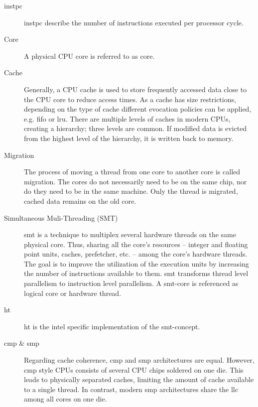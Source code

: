 \begin{description}
  \item[\Gls{instpc}] \Gls{instpc} describe the number of instructions executed
    per processor cycle.


  \item[Core] A physical CPU core is referred to as core.

  \item[Cache] Generally, a CPU cache is used to store frequently accessed data
    close to the CPU core to reduce access times.
    As a cache has size restrictions, depending on the type of cache different
    evocation policies can be applied, e.g. \gls{fifo} or \gls{lru}.
    There are multiple levels of caches in modern CPUs, creating a hierarchy;
    three levels are common.
    If modified data is evicted from the highest level of the hierarchy, it is
    written back to memory.

  \item[Migration] The process of moving a thread from one core to another core
    is called migration.
    The cores do not necessarily need to be on the same chip, nor do they need
    to be in the same machine. Only the thread is migrated, cached data remains
    on the old core.

  \item[Simultaneous Muli-Threading (SMT)] \gls{smt} is a technique to multiplex several hardware
    threads on the same physical core.
    Thus, sharing all the core's resources -- integer and floating point units,
    caches, prefetcher, etc. -- among the core's hardware threads.
    The goal is to improve the utilization of the execution units by increasing
    the number of instructions available to them.
    \gls{smt} transforms thread level parallelism to instruction level
    parallelism.
    A \gls{smt}-core is referenced as logical core or hardware thread.

  \item[\Gls{ht}] \gls{ht} is the \gls{intel} specific implementation of the
    \gls{smt}-concept.

  \item[\Gls{cmp}  \& \Gls{smp}] Regarding cache coherence, \gls{cmp} and
    \gls{smp} architectures are equal.
    However, \gls{cmp} style CPUs consists of several CPU chips soldered on one
    die.
    This leads to physically separated caches, limiting the amount of cache
    available to a single thread.
    In contrast, modern \gls{smp} architectures share the \gls{llc} among all
    cores on one die.


\end{description}
